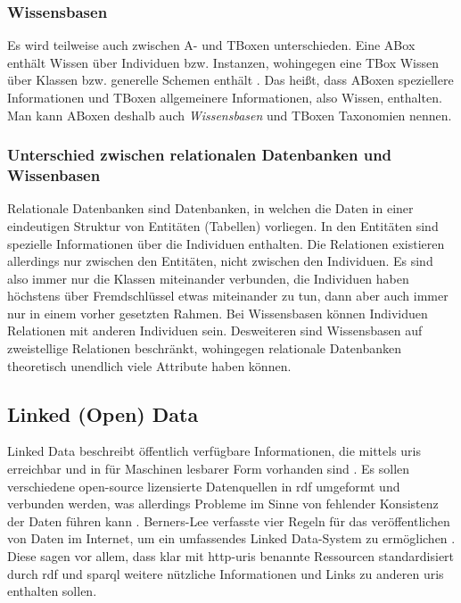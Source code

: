 \subsubsection{Wissensbasen}
Es wird teilweise auch zwischen A- und TBoxen unterschieden.
Eine ABox enthält Wissen über Individuen bzw. Instanzen, wohingegen eine TBox Wissen über Klassen bzw. generelle Schemen enthält \citep[S.~167]{semanticwebgrundlagen}.
Das heißt, dass ABoxen speziellere Informationen und TBoxen allgemeinere Informationen, also Wissen, enthalten.
Man kann ABoxen deshalb auch \emph{Wissensbasen} und TBoxen Taxonomien nennen.

\subsubsection{Unterschied zwischen relationalen Datenbanken und Wissenbasen}
Relationale Datenbanken sind Datenbanken, in welchen die Daten in einer eindeutigen Struktur von Entitäten (Tabellen) vorliegen.
In den Entitäten sind spezielle Informationen über die Individuen enthalten.
Die Relationen existieren allerdings nur zwischen den Entitäten, nicht zwischen den Individuen.
Es sind also immer nur die Klassen miteinander verbunden, die Individuen haben höchstens über Fremdschlüssel etwas miteinander zu tun, dann aber auch immer nur in einem vorher gesetzten Rahmen.
Bei Wissensbasen können Individuen Relationen mit anderen Individuen sein.
Desweiteren sind Wissensbasen auf zweistellige Relationen beschränkt, wohingegen relationale Datenbanken theoretisch unendlich viele Attribute haben können.

\subsection{Linked (Open) Data}

Linked Data beschreibt öffentlich verfügbare Informationen, die mittels \acp{uri} erreichbar und in für Maschinen lesbarer Form vorhanden sind \citep{linkeddata}.
Es sollen verschiedene open-source lizensierte Datenquellen in \ac{rdf} umgeformt und verbunden werden, was allerdings Probleme im Sinne von fehlender Konsistenz der Daten führen kann \citep{semanticwebreview}.
Berners-Lee verfasste vier Regeln für das veröffentlichen von Daten im Internet, um ein umfassendes Linked Data-System zu ermöglichen \citep{linkeddatadesignissues}.
Diese sagen vor allem, dass klar mit \ac{http}-\acp{uri} benannte Ressourcen standardisiert durch \ac{rdf} und \ac{sparql} weitere nützliche Informationen und Links zu anderen \acp{uri} enthalten sollen.

